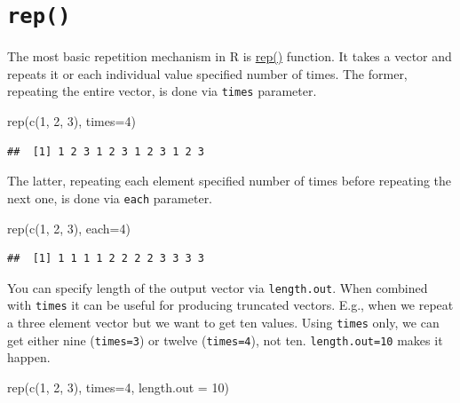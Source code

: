 \documentclass[
]{book}
\newenvironment{Shaded}{\begin{snugshade}}{\end{snugshade}}
\newcommand{\AttributeTok}[1]{\textcolor[rgb]{0.77,0.63,0.00}{#1}}
\newcommand{\DecValTok}[1]{\textcolor[rgb]{0.00,0.00,0.81}{#1}}
\newcommand{\FunctionTok}[1]{\textcolor[rgb]{0.00,0.00,0.00}{#1}}
\newcommand{\NormalTok}[1]{#1}
\begin{document}
\hypertarget{rep}{%
\section{\texorpdfstring{\texttt{rep()}}{rep()}}\label{rep}}

The most basic repetition mechanism in R is \href{https://stat.ethz.ch/R-manual/R-devel/library/base/html/rep.html}{rep()} function. It takes a vector and repeats it or each individual value specified number of times. The former, repeating the entire vector, is done via \texttt{times} parameter.

\begin{Shaded}
\begin{Highlighting}[]
\FunctionTok{rep}\NormalTok{(}\FunctionTok{c}\NormalTok{(}\DecValTok{1}\NormalTok{, }\DecValTok{2}\NormalTok{, }\DecValTok{3}\NormalTok{), }\AttributeTok{times=}\DecValTok{4}\NormalTok{)}
\end{Highlighting}
\end{Shaded}

\begin{verbatim}
##  [1] 1 2 3 1 2 3 1 2 3 1 2 3
\end{verbatim}

The latter, repeating each element specified number of times before repeating the next one, is done via \texttt{each} parameter.

\begin{Shaded}
\begin{Highlighting}[]
\FunctionTok{rep}\NormalTok{(}\FunctionTok{c}\NormalTok{(}\DecValTok{1}\NormalTok{, }\DecValTok{2}\NormalTok{, }\DecValTok{3}\NormalTok{), }\AttributeTok{each=}\DecValTok{4}\NormalTok{)}
\end{Highlighting}
\end{Shaded}

\begin{verbatim}
##  [1] 1 1 1 1 2 2 2 2 3 3 3 3
\end{verbatim}

You can specify length of the output vector via \texttt{length.out}. When combined with \texttt{times} it can be useful for producing truncated vectors. E.g., when we repeat a three element vector but we want to get ten values. Using \texttt{times} only, we can get either nine (\texttt{times=3}) or twelve (\texttt{times=4}), not ten. \texttt{length.out=10} makes it happen.

\begin{Shaded}
\begin{Highlighting}[]
\FunctionTok{rep}\NormalTok{(}\FunctionTok{c}\NormalTok{(}\DecValTok{1}\NormalTok{, }\DecValTok{2}\NormalTok{, }\DecValTok{3}\NormalTok{), }\AttributeTok{times=}\DecValTok{4}\NormalTok{, }\AttributeTok{length.out =} \DecValTok{10}\NormalTok{)}
\end{Highlighting}
\end{Shaded}
\end{document}
